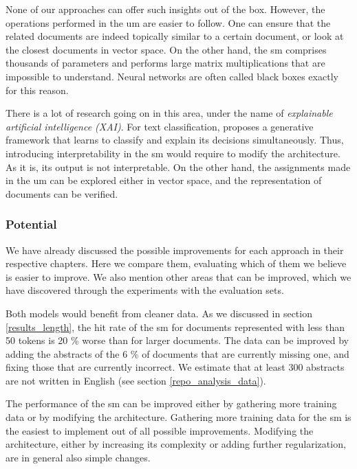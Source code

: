 None of our approaches can offer such insights out of the box. However, the operations performed in the \acrshort{um} are easier to follow. One can ensure that the related documents are indeed topically similar to a certain document, or look at the closest documents in vector space. On the other hand, the \acrshort{sm} comprises thousands of parameters and performs large matrix multiplications that are impossible to understand. Neural networks are often called black boxes exactly for this reason.

There is a lot of research going on in this area, under the name of \textit{explainable artificial intelligence (XAI)}. For text classification, \cite{liu2019towards} proposes a generative framework that learns to classify and explain its decisions simultaneously. Thus, introducing interpretability in the \acrshort{sm} would require to modify the architecture. As it is, its output is not interpretable. On the other hand, the assignments made in the \acrshort{um} can be explored either in vector space, and the representation of documents can be verified.

\subsubsection{Potential}

We have already discussed the possible improvements for each approach in their respective chapters. Here we compare them, evaluating which of them we believe is easier to improve. We also mention other areas that can be improved, which we have discovered through the experiments with the evaluation sets.

Both models would benefit from cleaner data. As we discussed in section \ref{results_length}, the hit rate of the \acrshort{sm} for documents represented with less than 50 tokens is 20 \% worse than for larger documents. The data can be improved by adding the abstracts of the 6 \% of documents that are currently missing one, and fixing those that are currently incorrect. We estimate that at least 300 abstracts are not written in English (see section \ref{repo_analysis_data}).

The performance of the \acrshort{sm} can be improved either by gathering more training data or by modifying the architecture. Gathering more training data for the \acrshort{sm} is the easiest to implement out of all possible improvements. Modifying the architecture, either by increasing its complexity or adding further regularization, are in general also simple changes.

